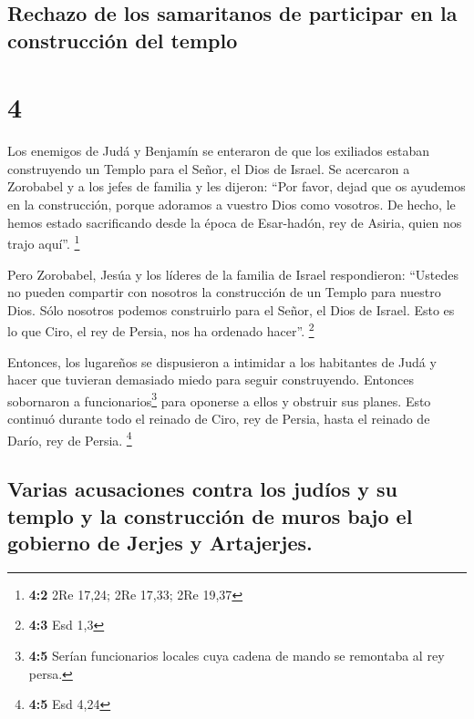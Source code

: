 \hypertarget{rechazo-de-los-samaritanos-de-participar-en-la-construcciuxf3n-del-templo}{%
\subsection{Rechazo de los samaritanos de participar en la construcción
del
templo}\label{rechazo-de-los-samaritanos-de-participar-en-la-construcciuxf3n-del-templo}}

\hypertarget{section-3}{%
\section{4}\label{section-3}}

 Los enemigos de Judá y Benjamín se enteraron de que los
exiliados estaban construyendo un Templo para el Señor, el Dios de
Israel.  Se acercaron a Zorobabel y a los jefes de familia
y les dijeron: ``Por favor, dejad que os ayudemos en la construcción,
porque adoramos a vuestro Dios como vosotros. De hecho, le hemos estado
sacrificando desde la época de Esar-hadón, rey de Asiria, quien nos
trajo aquí''. \footnote{\textbf{4:2} 2Re 17,24; 2Re 17,33; 2Re 19,37}

 Pero Zorobabel, Jesúa y los líderes de la familia de
Israel respondieron: ``Ustedes no pueden compartir con nosotros la
construcción de un Templo para nuestro Dios. Sólo nosotros podemos
construirlo para el Señor, el Dios de Israel. Esto es lo que Ciro, el
rey de Persia, nos ha ordenado hacer''. \footnote{\textbf{4:3} Esd 1,3}

 Entonces, los lugareños se dispusieron a intimidar a los
habitantes de Judá y hacer que tuvieran demasiado miedo para seguir
construyendo.  Entonces sobornaron a
funcionarios\footnote{\textbf{4:5} Serían funcionarios locales cuya
  cadena de mando se remontaba al rey persa.} para oponerse a ellos y
obstruir sus planes. Esto continuó durante todo el reinado de Ciro, rey
de Persia, hasta el reinado de Darío, rey de Persia. \footnote{\textbf{4:5}
  Esd 4,24}

\hypertarget{varias-acusaciones-contra-los-juduxedos-y-su-templo-y-la-construcciuxf3n-de-muros-bajo-el-gobierno-de-jerjes-y-artajerjes.}{%
\subsection{Varias acusaciones contra los judíos y su templo y la
construcción de muros bajo el gobierno de Jerjes y
Artajerjes.}\label{varias-acusaciones-contra-los-juduxedos-y-su-templo-y-la-construcciuxf3n-de-muros-bajo-el-gobierno-de-jerjes-y-artajerjes.}}

